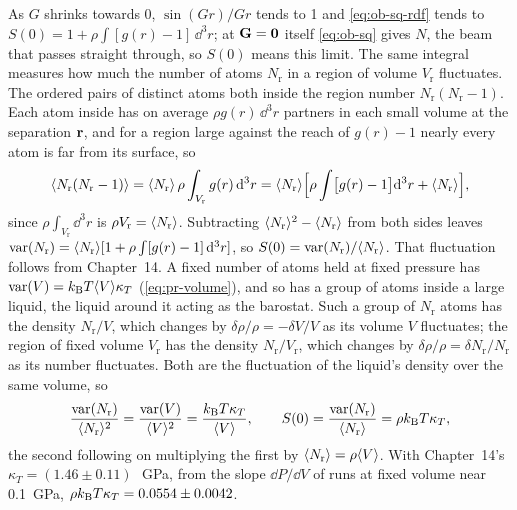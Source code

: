 As $G$ shrinks towards 0, $\sin(Gr)/Gr$ tends to 1 and
\cref{eq:ob-sq-rdf} tends to $S(0) = 1 + \rho\int[g(r) - 1]\,\dd^3r$; at
$\bm{\mathrm{G}} = \bm{\mathrm{0}}$ itself \cref{eq:ob-sq} gives $N$, the beam that passes
straight through, so $S(0)$ means this limit. The same integral measures
how much the number of atoms $N_{\mathrm r}$ in a region of volume
$V_{\mathrm r}$ fluctuates. The
ordered pairs of distinct atoms both inside the region number $N_{\mathrm r}(N_{\mathrm r} -
1)$. Each atom inside has on average $\rho g(r)\,\dd^3r$ partners in each
small volume at the separation $\bm{\mathrm{r}}$, and for a region large against
the reach of $g(r) - 1$ nearly every atom is far from its surface, so
\begin{equation*}
   \langle N_{\mathrm r}(N_{\mathrm r} - 1) \rangle
   = \langle N_{\mathrm r} \rangle\,\rho\int_{V_{\mathrm r}}g(r)\,\mathrm{d}^3r
   = \langle N_{\mathrm r} \rangle\Bigl[\rho\int\bigl[g(r) - 1\bigr]\mathrm{d}^3r
   + \langle N_{\mathrm r} \rangle\Bigr] ,
\end{equation*}
since $\rho\int_{V_{\mathrm r}}\dd^3r$ is $\rho V_{\mathrm r} =
\langle N_{\mathrm r} \rangle$. Subtracting $\langle N_{\mathrm r} \rangle^2 -
\langle N_{\mathrm r} \rangle$ from both sides leaves $\operatorname{var}(N_{\mathrm r}) = \langle N_{\mathrm r} \rangle[1
+ \rho\int[g(r) - 1]\,\mathrm{d}^3r]$, so $S(0) = \operatorname{var}(N_{\mathrm r})/
\langle N_{\mathrm r} \rangle$. That fluctuation follows from Chapter~14. A fixed number of
atoms held at fixed pressure has $\operatorname{var}(V) =
k_{\mathrm{B}} T\langle V \rangle\kappa_T$ (\cref{eq:pr-volume}), and so has a group of atoms
inside a large liquid, the liquid around it acting as the barostat. Such
a group of $N_{\mathrm r}$ atoms has the density $N_{\mathrm r}/V$, which
changes by $\delta\rho/\rho = -\delta V/V$ as its volume $V$ fluctuates;
the region of fixed volume $V_{\mathrm r}$ has the density $N_{\mathrm
r}/V_{\mathrm r}$, which changes by $\delta\rho/\rho = \delta N_{\mathrm
r}/N_{\mathrm r}$ as its number fluctuates. Both are the fluctuation of the
liquid's density over the same volume, so
\begin{equation*}
   \frac{\operatorname{var}(N_{\mathrm r})}{\langle N_{\mathrm r} \rangle^2} =
   \frac{\operatorname{var}(V)}{\langle V \rangle^2} = \frac{k_{\mathrm{B}} T\kappa_T}{\langle V \rangle} ,
   \qquad
   S(0) = \frac{\operatorname{var}(N_{\mathrm r})}{\langle N_{\mathrm r} \rangle} = \rho k_{\mathrm{B}} T\kappa_T ,
\end{equation*}
the second following on multiplying the first by $\langle N_{\mathrm r} \rangle =
\rho\langle V \rangle$. With Chapter~14's $\kappa_T = (1.46 \pm
0.11)$\,\si{\per\giga\pascal}, from the slope $\dd P/\dd V$ of runs at fixed
volume near \SI{0.1}{\giga\pascal}, $\rho k_{\mathrm{B}} T\kappa_T = 0.0554 \pm
0.0042$.

